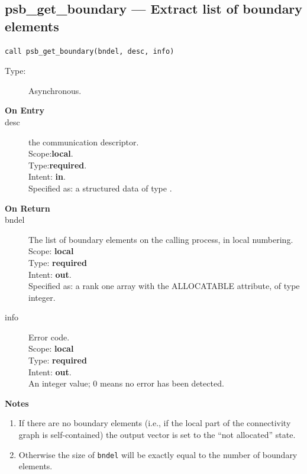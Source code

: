 %
%
\clearpage\subsection{psb\_get\_boundary --- Extract list of boundary
  elements}

\begin{verbatim}
call psb_get_boundary(bndel, desc, info)
\end{verbatim}

\begin{description}
\item[Type:] Asynchronous.
\item[\bf On Entry]
\item[desc] the communication descriptor.\\
Scope:{\bf local}.\\
Type:{\bf required}.\\
Intent: {\bf in}.\\
Specified as: a structured data of type \descdata.
\end{description}

\begin{description}
\item[\bf On Return]
\item[bndel] The list of boundary elements on the calling process, in
  local numbering.\\
Scope: {\bf local} \\
Type: {\bf required}\\
Intent: {\bf out}.\\
Specified as: a rank one array with the ALLOCATABLE
attribute, of type integer.\\
\item[info] Error code.\\
Scope: {\bf local} \\
Type: {\bf required} \\
Intent: {\bf out}.\\
An integer value; 0 means no error has been detected. 
\end{description}

{\par\noindent\large\bfseries Notes}
\begin{enumerate}
\item If there are no boundary elements (i.e., if the local part of
  the connectivity graph is self-contained) the output vector is set
  to the ``not allocated'' state. 
\item Otherwise the size of \verb|bndel| will be exactly equal to the
  number of boundary elements. 
\end{enumerate}

